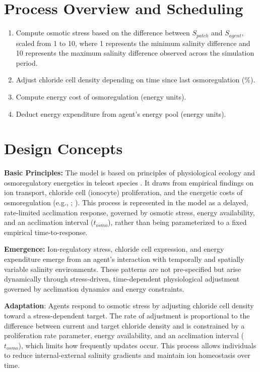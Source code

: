 \documentclass[
]{book}
\begin{document}
\section{Process Overview and Scheduling}\label{process-overview-and-scheduling-2}

\begin{enumerate}
\def\labelenumi{\arabic{enumi}.}
\item
  Compute osmotic stress based on the difference between \(S_{patch}\)
  and \(S_{agent}\), scaled from 1 to 10, where 1 represents the minimum
  salinity difference and 10 represents the maximum salinity
  difference observed across the simulation period.
\item
  Adjust chloride cell density depending on time since last
  osmoregulation (\%).
\item
  Compute energy cost of osmoregulation (energy units).
\item
  Deduct energy expenditure from agent's energy pool (energy units).
\end{enumerate}

\section{Design Concepts}\label{design-concepts-2}

\textbf{Basic Principles:} The model is based on principles of physiological
ecology and osmoregulatory energetics in teleost species
\citep{evans_osmotic_2008}. It draws from empirical findings on ion
transport, chloride cell (ionocyte) proliferation, and the energetic
costs of osmoregulation (e.g., \citet{allen_mechanisms_2009};
\citet{little_metabolic_2023}). This process is represented in the model as a
delayed, rate-limited acclimation response, governed by osmotic stress,
energy availability, and an acclimation interval (\(t_{osmo}\)), rather
than being parameterized to a fixed empirical time-to-response.

\textbf{Emergence:} Ion-regulatory stress, chloride cell expression, and
energy expenditure emerge from an agent's interaction with temporally
and spatially variable salinity environments. These patterns are not
pre-specified but arise dynamically through stress-driven,
time-dependent physiological adjustment governed by acclimation dynamics
and energy constraints.

\textbf{Adaptation}: Agents respond to osmotic stress by adjusting chloride
cell density toward a stress-dependent target. The rate of adjustment is
proportional to the difference between current and target chloride
density and is constrained by a proliferation rate parameter, energy
availability, and an acclimation interval (\(t_{osmo}\)), which limits how
frequently updates occur. This process allows individuals to reduce
internal-external salinity gradients and maintain ion homeostasis over
time.
\end{document}
